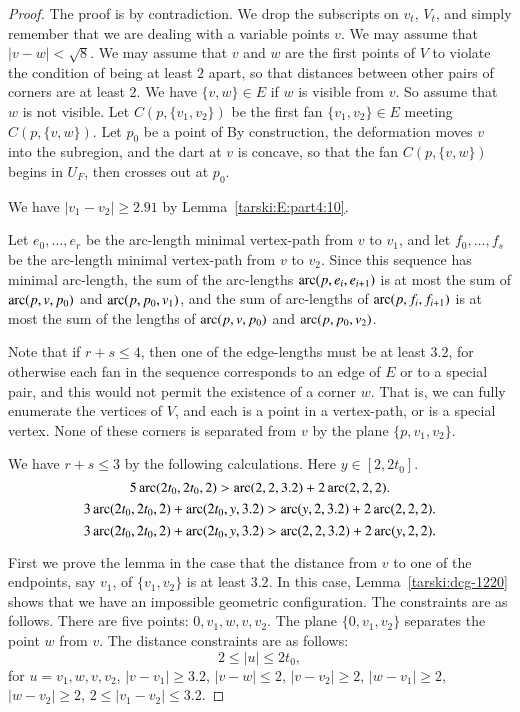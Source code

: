 \begin{proof}
The proof is by contradiction.  We drop the subscripts on $v_t$, $V_t$,
and simply remember that we are dealing with a variable points $v$.
We may assume that $|v-w|<\sqrt8$.
We may assume that $v$ and $w$ are the first points of $V$ to violate
the condition of being at least $2$ apart, so that distances
between other pairs of corners are at least $2$.  We have $\{v,w\}\in E$
if $w$ is visible from $v$. So assume
that $w$ is not visible.  Let $C(p,\{v_1,v_2\})$ be the first
fan $\{v_1,v_2\}\in E$ meeting $C(p,\{v,w\})$.  Let  $p_0$ be a point of
By
construction, the deformation moves $v$ into the subregion, and
the dart at $v$ is concave, so that the fan
$C(p,\{v,w\})$ begins in $U_F$, then crosses out at
$p_0$.

We have $|v_1-v_2|\ge2.91$ by Lemma~\ref{tarski:E:part4:10}.

Let $e_0,\ldots,e_r$ be the arc-length minimal vertex-path from $v$ to
$v_1$, and let $f_0,\ldots,f_s$ be the arc-length minimal vertex-path from
$v$ to $v_2$. Since this sequence has minimal arc-length, the
sum of the arc-lengths $\operatorname{arc}(p,e_i,e_{i+1})$ is at most the sum of 
$\operatorname{arc}(p,v,p_0)$ and $\operatorname{arc}(p,p_0,v_1)$, and the sum of arc-lengths of $\operatorname{arc}(p,f_i,f_{i+1})$
is at most the sum of the lengths of $\operatorname{arc}(p,v,p_0)$ and $\operatorname{arc}(p,p_0,v_2)$.

Note that if $r+s\le4$, then one of the edge-lengths must be at
least $3.2$, for otherwise each fan in the sequence corresponds to
an 
edge of $E$ or to a special pair, and this would not permit
the existence of a corner $w$. That is, we can fully enumerate the
vertices of $V$, and each is a
point in a vertex-path, or is a special vertex.
None of these corners is separated from $v$ by the plane
$\{p,v_1,v_2\}$.

We have $r+s\le3$ by the following calculations.  Here
$y\in[2,2t_0]$.
    $$5\operatorname{arc}(2t_0,2t_0,2) > \operatorname{arc}(2,2,3.2)+ 2 \operatorname{arc}(2,2,2).$$
    $$3\operatorname{arc}(2t_0,2t_0,2) + \operatorname{arc}(2t_0,y,3.2) > \operatorname{arc}(y,2,3.2) + 2 \operatorname{arc}(2,2,2).$$
    $$3\operatorname{arc}(2t_0,2t_0,2) + \operatorname{arc}(2t_0,y,3.2) > \operatorname{arc}(2,2,3.2) + 2\operatorname{arc}(y,2,2).$$


First we prove the lemma in the case that the distance from
$v$ to one of the endpoints, say $v_1$, of $\{v_1,v_2\}$ is at least
$3.2$. In this case, Lemma~\ref{tarski:dcg-1220} shows
that we have an
impossible geometric configuration. The
constraints are as follows.  There are five points: $0,v_1,w,v,v_2$.
The plane $\{0,v_1,v_2\}$ separates the point $w$ from $v$. The
distance constraints are as follows:
    $$2\le |u| \le 2t_0,$$
for $u=v_1,w,v,v_2$, $|v-v_1|\ge 3.2$, $|v-w|\le2$, $|v-v_2|\ge2$,
$|w-v_1|\ge2$, $|w-v_2|\ge2$, $2\le |v_1-v_2|\le 3.2$.


\end{proof}
